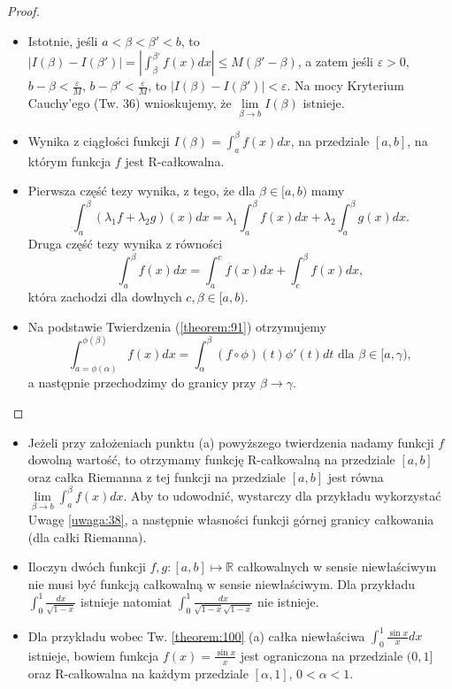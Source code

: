 \documentclass[leqno]{article}
\begin{document}
\begin{justify}
\begin{proof}
    \begin{itemize}
        \item [(a)]
            Istotnie, jeśli $a < \beta < \beta' < b$, to $|I(\beta) - I(\beta')| = |\int_{\beta}^{\beta'}f(x)dx| \leqslant M(\beta' - \beta)$,
            a zatem jeśli $\varepsilon > 0$, $b - \beta < \frac{\varepsilon}{M}$, $b - \beta' < \frac{\varepsilon}{M}$, to $|I(\beta) - I(\beta')| < \varepsilon$.
            Na mocy Kryterium Cauchy'ego (Tw. 36) wnioskujemy, że $\lim\limits_{\beta \to b} I(\beta)$ istnieje.
        \item [(b)]
            Wynika z ciągłości funkcji $I(\beta) = \int_{a}^{\beta}f(x)dx$, na przedziale $[a,b]$, na którym funkcja $f$ jest R-całkowalna.
        \item [(c)]
            Pierwsza część tezy wynika, z tego, że dla $\beta \in [a,b)$ mamy
            \[
                \int_{a}^{\beta}(\lambda_1f + \lambda_2g)(x)dx = \lambda_1 \int_{a}^{\beta}f(x)dx + \lambda_2 \int_{a}^{\beta} g(x)dx.
            \]
            Druga część tezy wynika z równości
            \[
                \int_{a}^{\beta}f(x)dx = \int_{a}^{c}f(x)dx + \int_{c}^{\beta}f(x)dx,
            \]
            która zachodzi dla dowlnych $c, \beta \in [a,b)$. 
        \item [(d)]
            Na podstawie Twierdzenia (\ref{theorem:91}) otrzymujemy
            \[
                \int_{a=\phi(\alpha)}^{\phi(\beta)}f(x)dx = \int_{\alpha}^{\beta}(f \circ \phi)(t)\phi'(t)dt \text{ dla } \beta \in [a,\gamma),
            \]
            a następnie przechodzimy do granicy przy $\beta \to \gamma$. 
    \end{itemize}
\end{proof}

\begin{uwaga}
    \begin{itemize}
        \item [(a)]
            Jeżeli przy założeniach punktu (a) powyższego twierdzenia nadamy funkcji $f$ dowolną wartość, to otrzymamy funkcję R-całkowalną na przedziale $[a,b]$
            oraz całka Riemanna z tej funkcji na przedziale $[a,b]$ jest równa $\lim\limits_{\beta \to b}\int_{a}^{\beta}f(x)dx$. 
            Aby to udowodnić, wystarczy dla przykładu wykorzystać Uwagę \ref{uwaga:38}, a następnie własności funkcji górnej granicy całkowania (dla całki Riemanna).
        \item [(b)]
            Iloczyn dwóch funkcji $f, g : [a,b] \mapsto \mathbb{R}$ całkowalnych w sensie niewłaściwym nie musi być funkcją całkowalną w sensie niewłaściwym. Dla przykładu
            $\int_{0}^{1}\frac{dx}{\sqrt{1-x}}$ istnieje natomiat $\int_{0}^{1}\frac{dx}{\sqrt{1-x}\sqrt{1-x}}$ nie istnieje.
        \item [(c)]
            Dla przykładu wobec Tw. \ref{theorem:100} (a) całka niewłaściwa $\int_{0}^{1}\frac{\sin x}{x}dx$ istnieje, bowiem funkcja $f(x) = \frac{\sin x}{x}$ jest ograniczona
            na przedziale $(0, 1]$ oraz R-całkowalna na każdym przedziale $[\alpha, 1]$, $0 < \alpha < 1$. 
    \end{itemize}
\end{uwaga}


\end{justify}
\end{document}
